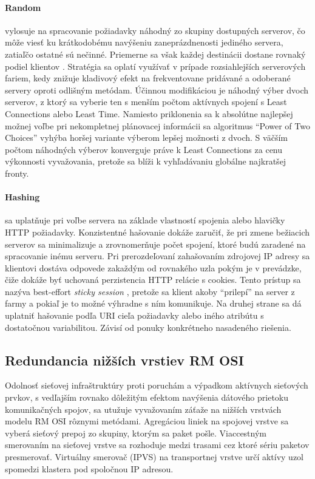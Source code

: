 \documentclass[12pt, a4paper]{article}
\begin{document}
\paragraph{Random} vylosuje na spracovanie požiadavky náhodný zo skupiny dostupných serverov, 
čo môže viesť ku krátkodobému navýšeniu zaneprázdnenosti jediného servera, zatiaľčo
ostatné sú nečinné. Priemerne sa však každej destinácii dostane rovnaký podiel klientov 
\cite{load-balance-in-distributed-system}. Stratégia sa oplatí využívať v prípade rozsiahlejších 
serverových fariem, kedy znižuje kladivový efekt na frekventovane pridávané a odoberané servery oproti
odlišným metódam. Účinnou modifikáciou je náhodný výber dvoch serverov, z ktorý sa vyberie ten
s menším počtom aktívnych spojení s Least Connections alebo Least Time. Namiesto priklonenia sa
k absolútne najlepšej možnej voľbe pri nekompletnej plánovacej informácii sa algoritmus
\enquote{Power of Two Choices} vyhýba horšej variante výberom lepšej možnosti z dvoch. S väčším počtom
náhodných výberov konverguje práve k Least Connections \cite{power-two-choices} za cenu výkonnosti 
vyvažovania, pretože sa blíži k vyhľadávaniu globálne najkratšej fronty.

\paragraph{Hashing} sa uplatňuje pri voľbe servera na základe vlastností spojenia alebo hlavičky HTTP 
požiadavky. Konzistentné hašovanie dokáže zaručiť, že pri zmene bežiacich serverov sa minimalizuje a 
zrovnomerňuje počet spojení, ktoré budú zaradené na spracovanie inému serveru. Pri prerozdeľovaní 
zahašovaním zdrojovej IP adresy sa klientovi dostáva odpovede zakaždým od rovnakého uzla pokým je v 
prevádzke, čiže dokáže byť uchovaná perzistencia HTTP relácie s cookies. Tento prístup sa nazýva
best-effort \emph{sticky session} \cite{haproxy-docs}, pretože sa klient akoby \enquote{prilepí} na server
z farmy a pokiaľ je to možné výhradne s ním komunikuje. Na druhej strane sa dá uplatniť hašovanie podľa 
URI cieľa požiadavky alebo iného atribútu s dostatočnou variabilitou. Závisí od ponuky konkrétneho 
nasadeného riešenia.

\subsection{Redundancia nižších vrstiev RM OSI}
Odolnosť sieťovej infraštruktúry proti poruchám a výpadkom aktívnych sieťových prvkov, s vedľajším
rovnako dôležitým efektom navýšenia dátového prietoku komunikačných spojov, sa utužuje vyvažovaním záťaže
na nižších vrstvách modelu RM OSI rôznymi metódami. Agregáciou liniek na spojovej vrstve sa vyberá sieťový 
prepoj zo skupiny, ktorým sa paket pošle. Viaccestným smerovaním na sieťovej vrstve sa rozhoduje medzi 
trasami cez ktoré sériu paketov presmerovať. Virtuálny smerovač (IPVS) na transportnej vrstve určí
aktívy uzol spomedzi klastera pod spoločnou IP adresou.
\end{document}
